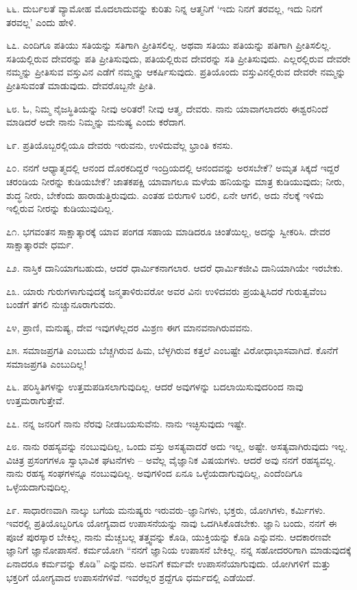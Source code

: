 ೬೬. ದುರ್ಬಲತೆ ವ್ಯಾಮೋಹ ಮೊದಲಾದುವನ್ನು ಕುರಿತು ನಿನ್ನ ಆತ್ಮನಿಗೆ ‘ಇದು ನಿನಗೆ ತರವಲ್ಲ, ಇದು ನಿನಗೆ ತರವಲ್ಲ’ ಎಂದು ಹೇಳಿ.

೬೭. ಎಂದಿಗೂ ಪತಿಯು ಸತಿಯನ್ನು ಸತಿಗಾಗಿ ಪ್ರೀತಿಸಲಿಲ್ಲ. ಅಥವಾ ಸತಿಯು ಪತಿಯನ್ನು ಪತಿಗಾಗಿ ಪ್ರೀತಿಸಲಿಲ್ಲ. ಸತಿಯಲ್ಲಿರುವ ದೇವರನ್ನು ಪತಿ ಪ್ರೀತಿಸುವುದು, ಪತಿಯಲ್ಲಿರುವ ದೇವರನ್ನು ಸತಿ ಪ್ರೀತಿಸುವುದು. ಎಲ್ಲರಲ್ಲಿರುವ ದೇವರೇ ನಮ್ಮನ್ನು ಪ್ರೀತಿಸುವ ವಸ್ತುವಿನ ಎಡೆಗೆ ನಮ್ಮನ್ನು ಆಕರ್ಷಿಸುವುದು. ಪ್ರತಿಯೊಂದು ವಸ್ತುವಿನಲ್ಲಿರುವ ದೇವರೇ ನಮ್ಮನ್ನು ಪ್ರೀತಿಸುವಂತೆ ಮಾಡುವುದು. ದೇವರೊಬ್ಬನೇ ಪ್ರೀತಿ.

೬೮. ಓ, ನಿಮ್ಮ ನೈಜಸ್ಥಿತಿಯನ್ನು ನೀವು ಅರಿತರೆ! ನೀವು ಆತ್ಮ, ದೇವರು. ನಾನು ಯಾವಾಗಲಾದರು ಈಶ್ವರನಿಂದೆ ಮಾಡಿದರೆ ಅದೇ ನಾನು ನಿಮ್ಮನ್ನು ಮನುಷ್ಯ ಎಂದು ಕರೆದಾಗ.

೬೯. ಪ್ರತಿಯೊಬ್ಬರಲ್ಲಿಯೂ ದೇವರು ಇರುವನು, ಉಳಿದುವೆಲ್ಲ ಭ್ರಾಂತಿ ಕನಸು.

೭೦. ನನಗೆ ಆಧ್ಯಾತ್ಮದಲ್ಲಿ ಆನಂದ ದೊರಕದಿದ್ದರೆ ಇಂದ್ರಿಯದಲ್ಲಿ ಆನಂದವನ್ನು ಅರಸಬೇಕೆ? ಅಮೃತ ಸಿಕ್ಕದೆ ಇದ್ದರೆ ಚರಂಡಿಯ ನೀರನ್ನು ಕುಡಿಯಬೇಕೆ? ಜಾತಕಪಕ್ಷಿ ಯಾವಾಗಲೂ ಮಳೆಯ ಹನಿಯನ್ನು ಮಾತ್ರ ಕುಡಿಯುವುದು; ನೀರು, ಶುದ್ಧ ನೀರು, ಬೇಕೆಂದು ಹಾರಾಡುತ್ತಿರುವುದು. ಎಂತಹ ಬಿರುಗಾಳಿ ಬರಲಿ, ಏನೇ ಆಗಲಿ, ಅದು ನೆಲಕ್ಕೆ ಇಳಿದು ಇಲ್ಲಿರುವ ನೀರನ್ನು ಕುಡಿಯುವುದಿಲ್ಲ.

೭೧. ಭಗವಂತನ ಸಾಕ್ಷಾತ್ಕಾರಕ್ಕೆ ಯಾವ ಪಂಗಡ ಸಹಾಯ ಮಾಡಿದರೂ ಚಿಂತೆಯಿಲ್ಲ, ಅದನ್ನು ಸ್ವೀಕರಿಸಿ. ದೇವರ ಸಾಕ್ಷಾತ್ಕಾರವೇ ಧರ್ಮ.

೭೨. ನಾಸ್ತಿಕ ದಾನಿಯಾಗಬಹುದು, ಆದರೆ ಧಾರ್ಮಿಕನಾಗಲಾರ. ಆದರೆ ಧಾರ್ಮಿಕಜೀವಿ ದಾನಿಯಾಗಿಯೇ ಇರಬೇಕು.

೭೩. ಯಾರು ಗುರುಗಳಾಗುವುದಕ್ಕೆ ಜನ್ಮತಾಳಿರುವರೋ ಅವರ ವಿನಃ ಉಳಿದವರು ಪ್ರಯತ್ನಿಸಿದರೆ ಗುರುತ್ವವೆಂಬ ಬಂಡೆಗೆ ತಗಲಿ ನುಚ್ಚುನೂರಾಗುವರು.

೭೪, ಪ್ರಾಣಿ, ಮನುಷ್ಯ, ದೇವ ಇವುಗಳೆಲ್ಲದರ ಮಿಶ್ರಣ ಈಗ ಮಾನವನಾಗಿರುವವನು.

೭೫. ಸಮಾಜಪ್ರಗತಿ ಎಂಬುದು ಬೆಚ್ಚಗಿರುವ ಹಿಮ, ಬೆಳ್ಳಗಿರುವ ಕತ್ತಲೆ ಎಂಬಷ್ಟೇ ವಿರೋಧಾಭಾಸವಾಗಿದೆ. ಕೊನೆಗೆ ಸಮಾಜಪ್ರಗತಿ ಎಂಬುದಿಲ್ಲ!

೭೬. ಪರಿಸ್ಥಿತಿಗಳನ್ನು ಉತ್ತಮಪಡಿಸಲಾಗುವುದಿಲ್ಲ. ಆದರೆ ಅವುಗಳನ್ನು ಬದಲಾಯಿಸುವುದರಿಂದ ನಾವು ಉತ್ತಮರಾಗುತ್ತೇವೆ.

೭೭. ನನ್ನ ಜನರಿಗೆ ನಾನು ನೆರವು ನೀಡಬಯಸುವೆನು. ನಾನು ಇಚ್ಛಿಸುವುದು ಇಷ್ಟೇ.

೭೮. ನಾನು ರಹಸ್ಯವನ್ನು ನಂಬುವುದಿಲ್ಲ, ಒಂದು ವಸ್ತು ಅಸತ್ಯವಾದರೆ ಅದು ಇಲ್ಲ, ಅಷ್ಟೇ. ಅಸತ್ಯವಾಗಿರುವುದು ಇಲ್ಲ. ವಿಚಿತ್ರ ಪ್ರಸಂಗಗಳೂ ಸ್ವಾಭಾವಿಕ ಘಟನೆಗಳು – ಅವೆಲ್ಲ ವೈಜ್ಞಾನಿಕ ವಿಷಯಗಳು. ಆದರೆ ಅವು ನನಗೆ ರಹಸ್ಯವಲ್ಲ. ನಾನು ರಹಸ್ಯ ಸಂಘಗಳನ್ನೂ ನಂಬುವುದಿಲ್ಲ. ಅವುಗಳಿಂದ ಏನೂ ಒಳ್ಳೆಯದಾಗುವುದಿಲ್ಲ, ಎಂದೆಂದಿಗೂ ಒಳ್ಳೆಯದಾಗುವುದಿಲ್ಲ.

೭೯. ಸಾಧಾರಣವಾಗಿ ನಾಲ್ಕು ಬಗೆಯ ಮನುಷ್ಯರು ಇರುವರು–ಜ್ಞಾನಿಗಳು, ಭಕ್ತರು, ಯೋಗಿಗಳು, ಕರ್ಮಿಗಳು. ಇವರಲ್ಲಿ ಪ್ರತಿಯೊಬ್ಬರಿಗೂ ಯೋಗ್ಯವಾದ ಉಪಾಸನೆಯನ್ನು ನಾವು ಒದಗಿಸಿಕೊಡಬೇಕು. ಜ್ಞಾನಿ ಬಂದು, ನನಗೆ ಈ ಪೂಜೆ ಪುರಸ್ಕಾರ ಬೇಕಿಲ್ಲ, ನಾನು ಮೆಚ್ಚಬಲ್ಲ ತತ್ತ್ವವನ್ನು ಕೊಡಿ, ಯುಕ್ತಿಯನ್ನು ಕೊಡಿ ಎನ್ನುವನು. ಆದಕಾರಣವೇ ಜ್ಞಾನಿಗೆ ಜ್ಞಾನೋಪಾಸನೆ. ಕರ್ಮಯೋಗಿ “ನನಗೆ ಜ್ಞಾನಿಯ ಉಪಾಸನೆ ಬೇಕಿಲ್ಲ. ನನ್ನ ಸಹೋದರರಿಗಾಗಿ ಮಾಡುವುದಕ್ಕೆ ಏನಾದರೂ ಕರ್ಮವನ್ನು ಕೊಡಿ” ಎನ್ನುವನು. ಅವನಿಗೆ ಕರ್ಮವೇ ಉಪಾಸನೆಯಾಗುವುದು. ಯೋಗಿಗಳಿಗೆ ಮತ್ತು ಭಕ್ತರಿಗೆ ಯೋಗ್ಯವಾದ ಉಪಾಸನೆಗಳಿವೆ. ಇವರೆಲ್ಲರ ಶ್ರದ್ದೆಗೂ ಧರ್ಮದಲ್ಲಿ ಎಡೆಯಿದೆ.

